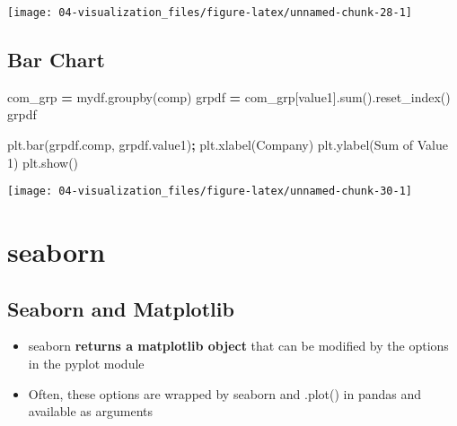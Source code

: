 \documentclass[
]{book}
\newenvironment{Shaded}{\begin{snugshade}}{\end{snugshade}}
\newcommand{\BuiltInTok}[1]{#1}
\newcommand{\NormalTok}[1]{#1}
\newcommand{\OperatorTok}[1]{\textcolor[rgb]{0.43,0.43,0.43}{\textbf{#1}}}
\newcommand{\StringTok}[1]{\textcolor[rgb]{0.5,0.5,0.5}{#1}}
\providecommand{\tightlist}{%
  \setlength{\itemsep}{0pt}\setlength{\parskip}{0pt}}
\begin{document}
\texttt{[image: 04-visualization\_files/figure-latex/unnamed-chunk-28-1]}

\hypertarget{bar-chart}{%
\section{Bar Chart}\label{bar-chart}}

\begin{Shaded}
\begin{Highlighting}[]
\NormalTok{com\_grp }\OperatorTok{=}\NormalTok{ mydf.groupby(}\StringTok{\textquotesingle{}comp\textquotesingle{}}\NormalTok{)}
\NormalTok{grpdf }\OperatorTok{=}\NormalTok{ com\_grp[}\StringTok{\textquotesingle{}value1\textquotesingle{}}\NormalTok{].}\BuiltInTok{sum}\NormalTok{().reset\_index()}
\NormalTok{grpdf}
\end{Highlighting}
\end{Shaded}

\begin{Shaded}
\begin{Highlighting}[]
\NormalTok{plt.bar(grpdf.comp, grpdf.value1)}\OperatorTok{;}
\NormalTok{plt.xlabel(}\StringTok{\textquotesingle{}Company\textquotesingle{}}\NormalTok{)}
\NormalTok{plt.ylabel(}\StringTok{\textquotesingle{}Sum of Value 1\textquotesingle{}}\NormalTok{)}
\NormalTok{plt.show()}
\end{Highlighting}
\end{Shaded}

\texttt{[image: 04-visualization\_files/figure-latex/unnamed-chunk-30-1]}

\hypertarget{seaborn}{%
\chapter{seaborn}\label{seaborn}}

\hypertarget{seaborn-and-matplotlib}{%
\section{Seaborn and Matplotlib}\label{seaborn-and-matplotlib}}

\begin{itemize}
\tightlist
\item
  seaborn \textbf{returns a matplotlib object} that can be modified by the options in the pyplot module\\
\item
  Often, these options are wrapped by seaborn and .plot() in pandas and available as arguments
\end{itemize}
\end{document}
